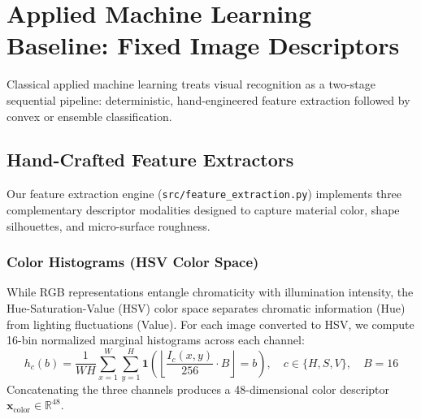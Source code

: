 \documentclass[11pt,a4paper]{article}
\begin{document}
\section{Applied Machine Learning Baseline: Fixed Image Descriptors}
Classical applied machine learning treats visual recognition as a two-stage sequential pipeline: deterministic, hand-engineered feature extraction followed by convex or ensemble classification.

\subsection{Hand-Crafted Feature Extractors}
Our feature extraction engine (\texttt{src/feature\_extraction.py}) implements three complementary descriptor modalities designed to capture material color, shape silhouettes, and micro-surface roughness.

\subsubsection{Color Histograms (HSV Color Space)}
While RGB representations entangle chromaticity with illumination intensity, the Hue-Saturation-Value (HSV) color space separates chromatic information (Hue) from lighting fluctuations (Value). For each image converted to HSV, we compute 16-bin normalized marginal histograms across each channel:
\begin{equation}
    h_c(b) = \frac{1}{WH} \sum_{x=1}^W \sum_{y=1}^H \mathbf{1}\left( \left\lfloor \frac{I_c(x, y)}{256} \cdot B \right\rfloor = b \right), \quad c \in \{H, S, V\}, \quad B = 16
\end{equation}
Concatenating the three channels produces a 48-dimensional color descriptor $\mathbf{x}_{\text{color}} \in \mathbb{R}^{48}$.
\end{document}
